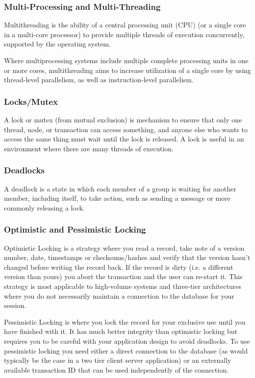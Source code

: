 \documentclass{article}
\begin{document}
    \subsubsection{Multi-Processing and Multi-Threading}
    Multithreading is the ability of a central processing unit (CPU) (or a single core in a multi-core processor) to provide multiple threads of execution concurrently, supported by the operating system.
    
    Where multiprocessing systems include multiple complete processing units in one or more cores, multithreading aims to increase utilization of a single core by using thread-level parallelism, as well as instruction-level parallelism.
    
    \subsubsection{Locks/Mutex}
    A lock  or mutex (from mutual exclusion) is mechanism to ensure that only one thread, node, or transaction can access something, and anyone else who wants to access the same thing must wait until the lock is released. A lock is useful in an environment where there are many threads of execution.
    
    \subsubsection{Deadlocks}
    A deadlock is a state in which each member of a group is waiting for another member, including itself, to take action, such as sending a message or more commonly releasing a lock.

    \subsubsection{Optimistic and Pessimistic Locking}
    Optimistic Locking is a strategy where you read a record, take note of a version number, date, timestamps or checksums/hashes and verify that the version hasn't changed before writing the record back. If the record is dirty (i.e. a different version than yours) you abort the transaction and the user can re-start it. This strategy is most applicable to high-volume systems and three-tier architectures where you do not necessarily maintain a connection to the database for your session.
    
    Pessimistic Locking is where you lock the record for your exclusive use until you have finished with it. It has much better integrity than optimistic locking but requires you to be careful with your application design to avoid deadlocks. To use pessimistic locking you need either a direct connection to the database (as would typically be the case in a two tier client server application) or an externally available transaction ID that can be used independently of the connection.
\end{document}
